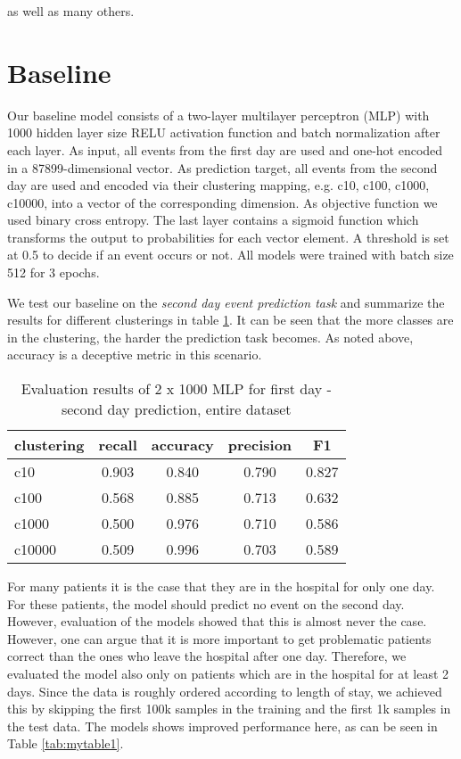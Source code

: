 as well as many others.

\section{Baseline}
\label{sec:baseline}

Our baseline model consists of a two-layer multilayer perceptron (MLP) with 1000 hidden layer size RELU \cite{agarapDeepLearningUsing2018} activation function and batch normalization after each layer. As input, all events from the first day are used and one-hot encoded in a 87899-dimensional vector. As prediction target, all events from the second day are used and encoded via their clustering mapping, e.g. c10, c100, c1000, c10000, into a vector of the corresponding dimension. As objective function we used binary cross entropy. The last layer contains a sigmoid function which transforms the output to probabilities for each vector element. A threshold is set at 0.5 to decide if an event occurs or not. All models were trained with batch size 512 for 3 epochs.

We test our baseline on the \emph{second day event prediction task} and summarize the results for different clusterings in table \ref{tab:mytable2}. It can be seen that the more classes are in the clustering, the harder the prediction task becomes. As noted above, accuracy is a deceptive metric in this scenario.

\begin{table}[H]
  \centering
    \begin{tabular}{lcccc} \toprule
        {clustering} & {recall} & {accuracy} & {precision} & {F1}  \\ \midrule
        {c10}  & 0.903 & 0.840 & 0.790 & 0.827 \\
        {c100}  & 0.568 & 0.885 & 0.713 & 0.632 \\
        {c1000}  & 0.500  & 0.976 & 0.710  & 0.586 \\
        {c10000}  & 0.509  & 0.996 &  0.703  & 0.589 \\ \midrule
    \end{tabular}
  \caption{Evaluation results of 2 x 1000 MLP for first day - second day  prediction, entire dataset}
  \label{tab:mytable2}
\end{table}



For many patients it is the case that they are in the hospital for only one day. For these patients, the model should predict no event on the second day. However, evaluation of the models showed that this is almost never the case. However, one can argue that it is more important to get problematic patients correct than the ones who leave the hospital after one day. Therefore, we evaluated the model also only on patients which are in the hospital for at least 2 days. Since the data is roughly ordered according to length of stay, we achieved this by skipping the first 100k samples in the training and the first 1k samples in the test data. The models shows improved performance here, as can be seen in Table \ref{tab:mytable1}.


